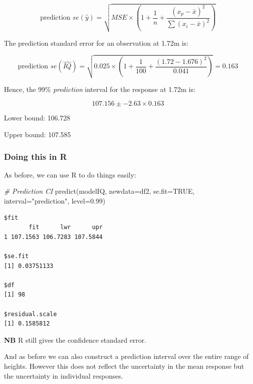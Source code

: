 \documentclass[
  oneside]{krantz}
\newenvironment{Shaded}{\begin{snugshade}}{\end{snugshade}}
\newcommand{\AttributeTok}[1]{\textcolor[rgb]{0.77,0.63,0.00}{#1}}
\newcommand{\CommentTok}[1]{\textcolor[rgb]{0.56,0.35,0.01}{\textit{#1}}}
\newcommand{\ConstantTok}[1]{\textcolor[rgb]{0.00,0.00,0.00}{#1}}
\newcommand{\FloatTok}[1]{\textcolor[rgb]{0.00,0.00,0.81}{#1}}
\newcommand{\FunctionTok}[1]{\textcolor[rgb]{0.00,0.00,0.00}{#1}}
\newcommand{\NormalTok}[1]{#1}
\newcommand{\StringTok}[1]{\textcolor[rgb]{0.31,0.60,0.02}{#1}}
\begin{document}
\[\textrm{prediction }se(\hat{y})=\sqrt{MSE\times (1+\frac{1}{n}+\frac{(x_p-\bar{x})^2}{\sum{(x_i-\bar{x})^2}})}\]

The prediction standard error for an observation at 1.72m is:

\[\textrm{prediction }se(\hat{IQ})=\sqrt{0.025\times (1+ \frac{1}{100}+\frac{(1.72-1.676)^2}{0.041})} =0.163\]

Hence, the 99\% \emph{prediction} interval for the response at 1.72m is:

\[107.156 \pm -2.63\times 0.163\]

Lower bound: 106.728

Upper bound: 107.585

\hypertarget{doing-this-in-r-29}{%
\subsubsection{Doing this in R}\label{doing-this-in-r-29}}

As before, we can use R to do things easily:

\begin{Shaded}
\begin{Highlighting}[]
\CommentTok{\# Prediction CI}
\FunctionTok{predict}\NormalTok{(modelIQ, }\AttributeTok{newdata=}\NormalTok{df2, }\AttributeTok{se.fit=}\ConstantTok{TRUE}\NormalTok{, }\AttributeTok{interval=}\StringTok{"prediction"}\NormalTok{, }
        \AttributeTok{level=}\FloatTok{0.99}\NormalTok{)}
\end{Highlighting}
\end{Shaded}

\begin{verbatim}
$fit
       fit      lwr      upr
1 107.1563 106.7283 107.5844

$se.fit
[1] 0.03751133

$df
[1] 98

$residual.scale
[1] 0.1585812
\end{verbatim}

\textbf{NB} R still gives the confidence standard error.

And as before we can also construct a prediction interval over the entire range of heights. However this does not reflect the uncertainty in the mean response but the uncertainty in individual responses.

\newpage
\end{document}
